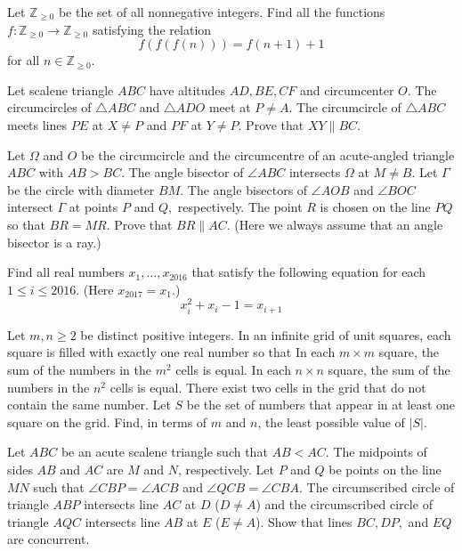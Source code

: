 \documentclass[11pt]{scrartcl}
\begin{document}
\begin{problem}[973095234047520]
	Let $\mathbb{Z}_{\ge 0}$ be the set of all nonnegative integers. Find all the functions $f: \mathbb{Z}_{\ge 0} \rightarrow \mathbb{Z}_{\ge 0} $ satisfying the relation
\[ f(f(f(n))) = f(n+1 ) +1 \]
for all $ n\in \mathbb{Z}_{\ge 0}$.
\end{problem}
\begin{problem}[9153191064326230951]
Let scalene triangle $ABC$ have altitudes $AD, BE, CF$ and circumcenter $O$. The circumcircles of $\triangle ABC$ and $\triangle ADO$ meet at $P \ne A$. The circumcircle of $\triangle ABC$ meets lines $PE$ at $X \ne P$ and $PF$ at $Y \ne P$. Prove that $XY \parallel BC$.
\end{problem}
\begin{problem}[4752965628566204727]
Let $\Omega$ and $O$ be the circumcircle and the circumcentre of an acute-angled triangle $ABC$ with $AB > BC$. The angle bisector of $\angle ABC$ intersects $\Omega$ at $M \ne B$. Let $\Gamma$ be the circle with diameter $BM$. The angle bisectors of $\angle AOB$ and $\angle BOC$ intersect $\Gamma$ at points $P$ and $Q,$ respectively. The point $R$ is chosen on the line $P Q$ so that $BR = MR$. Prove that $BR\parallel AC$.
(Here we always assume that an angle bisector is a ray.)
\end{problem}
\begin{problem}[397912644922719]
Find all real numbers $x_1, \dots, x_{2016}$ that satisfy the following equation for each $1 \le i \le 2016$. (Here $x_{2017} = x_1$.)
\[ x_i^2 + x_i - 1 = x_{i+1} \]
\end{problem}
\begin{problem}[919147551255493]
Let $m, n \ge 2$ be distinct positive integers. In an infinite grid of unit squares, each square is filled with exactly one real number so that
In each $m \times m$ square, the sum of the numbers in the $m^2$ cells is equal.
In each $n \times n$ square, the sum of the numbers in the $n^2$ cells is equal.
There exist two cells in the grid that do not contain the same number.
Let $S$ be the set of numbers that appear in at least one square on the grid. Find, in terms of $m$ and $n$, the least possible value of $|S|$.
\end{problem}
\begin{problem}[620564216459483]
Let $ABC$ be an acute scalene triangle such that $AB <AC$. The midpoints of sides $AB$ and $AC$ are $M$ and $N$, respectively. Let $P$ and $Q$ be points on the line $MN$ such that $\angle CBP = \angle ACB$ and $\angle QCB = \angle CBA$. The circumscribed circle of triangle $ABP$ intersects line $AC$ at $D$ ($D\ne A$) and the circumscribed circle of triangle $AQC$ intersects line $AB$ at $E$ ($E \ne A$). Show that lines $BC, DP,$ and $EQ$ are concurrent.
\end{problem}
\end{document}
